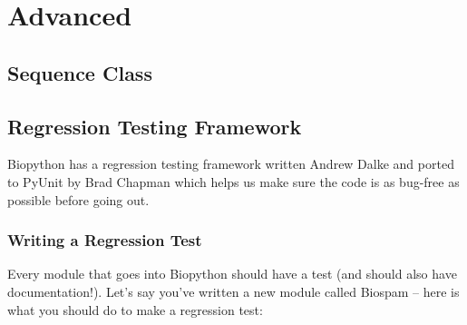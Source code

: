 \documentclass{report}
\begin{document}
\chapter{Advanced}

\section{Sequence Class}

\section{Regression Testing Framework}
\label{sec:regr_test}

Biopython has a regression testing framework written Andrew Dalke and ported to PyUnit by Brad Chapman which helps us make sure the code is as bug-free as possible before going out.

\subsection{Writing a Regression Test}

Every module that goes into Biopython should have a test (and should also have documentation!). Let's say you've written a new module called Biospam -- here is what you should do to make a regression test:
\end{document}
